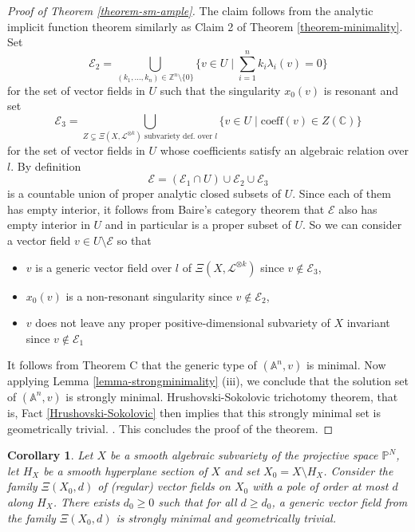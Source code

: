 \documentclass[12pt]{amsart}
\theoremstyle{definition}
\theoremstyle{plain}
\newtheorem{corollary}[definition]{Corollary}
\theoremstyle{exampstyle}
\theoremstyle{exampstyle}\newtheorem{thmxbis}{Theorem}
\numberwithin{equation}{section}
\theoremstyle{remark}
\begin{document}
\begin{proof}[Proof of Theorem \ref{theorem-sm-ample}]
The claim follows from the analytic implicit function theorem similarly as Claim 2 of Theorem \ref{theorem-minimality}. Set $$ \mathcal E_2 = \bigcup_{(k_1,\ldots, k_n) \in \mathbb{Z}^n \setminus \lbrace0 \rbrace} \Big\{ v \in U \mid \sum_{i = 1}^n k_i \lambda_i(v) = 0 \Big\} $$  
for the set of vector fields in $U$ such that the singularity $x_0(v)$ is resonant and set $$ \mathcal E_3 = \bigcup_{Z \subsetneq \Xi(X,\mathcal L^{\otimes k}) \text{  subvariety def. over } l} \Big\{ v \in U \mid \mathrm{coeff}(v) \in Z(\mathbb{C})  \Big\} $$ 
for the set of vector fields in $U$ whose coefficients satisfy an algebraic relation over $l$. By definition 
$$\mathcal E = (\mathcal E_1 \cap U) \cup \mathcal E_2 \cup \mathcal E_3$$
is a countable union of proper analytic closed subsets of $U$. Since each of them has empty interior, it follows from Baire's category theorem that  $ \mathcal E$ also has empty interior in $U$ and in particular is  a proper subset of $U$. So we can consider a vector field $v \in U \setminus \mathcal E$ so that
\begin{itemize} 

\item $v$ is a generic vector field over $l$ of $\Xi(X,\mathcal L^{\otimes k})$ since $v \notin \mathcal E_3$, 
\item $x_0(v)$ is a non-resonant singularity since $v \notin \mathcal E_2$,
\item $v$ does not leave any proper positive-dimensional subvariety of $X$ invariant since $v \notin \mathcal E_1$
\end{itemize}
It follows from Theorem C that the generic type of  $(\mathbb{A}^n,v)$  is minimal. Now applying Lemma \ref{lemma-strongminimality} (iii), we conclude that the solution set of  $(\mathbb{A}^n,v)$ is strongly minimal. Hrushovski-Sokolovic trichotomy theorem, that is, Fact \ref{Hrushovski-Sokolovic} then implies that this strongly minimal set is geometrically trivial. . This concludes the proof of the theorem. 
\end{proof} 

\begin{corollary} 
Let $X$ be a smooth algebraic subvariety of the projective space $\mathbb{P}^N$, let $H_X$ be a smooth hyperplane section of $X$ and set $X_0 = X \setminus H_X$. Consider the family $\Xi(X_0,d)$ of (regular) vector fields on $X_0$ with a pole of order at most $d$ along $H_X$. There exists $d_0 \geq 0$ such that for all $d \geq d_0$, a generic vector field  from the family $\Xi(X_0,d)$ is strongly minimal and geometrically trivial. 
\end{corollary}
\end{document}
